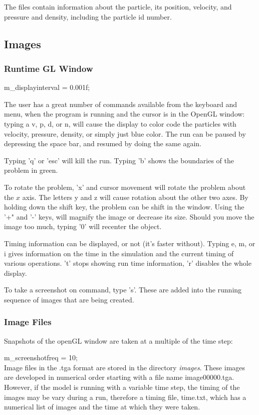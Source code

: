 \documentclass[12pt]{memoir}
\begin{document}
{{{{The files contain information about the particle, its position,
velocity, and pressure and density, including the particle id number.

\subsection{Images} \subsubsection{Runtime GL Window}

m\_displayinterval = 0.001f;

The user has a great number of commands available from the keyboard and
menu, when the program is running and the cursor is in the OpenGL
window: typing a v, p, d, or n, will cause the display to color code
the particles with velocity, pressure, density, or simply just blue
color. The run can be paused by depressing the space bar, and resumed
by doing the same again.

Typing 'q' or 'esc' will kill the run. Typing 'b' shows the boundaries
of the problem in green.

To rotate the problem, 'x' and cursor movement will rotate the problem
about the $x$ axis. The letters y and z will cause rotation about the
other two axes. By holding down the shift key, the problem can be shift
in the window. Using the '+" and '-' keys, will magnify the image or
decrease its size. Should you move the image too much, typing '0' will
recenter the object.

Timing information can be displayed, or not (it's faster without).
Typing e, m, or i gives information on the time in the simulation and
the current timing of various operations. 't' stops showing run time
information, 'r' disables the whole display.

To take a screenshot on command, type 's'. These are added into the
running sequence of images that are being created.

\subsubsection{Image Files}

Snapshots of the openGL window are taken at a multiple of the time step:

m\_screenshotfreq = 10;\\ Image files in the .tga format are stored in
the directory {\em images}. These images are developed in numerical
order starting with a file name image00000.tga. However, if the model is
running with a variable time step, the timing of the images may be vary
during a run, therefore a timing file, time.txt, which has a numerical
list of images and the time at which they were taken.

}}}}
\end{document}
